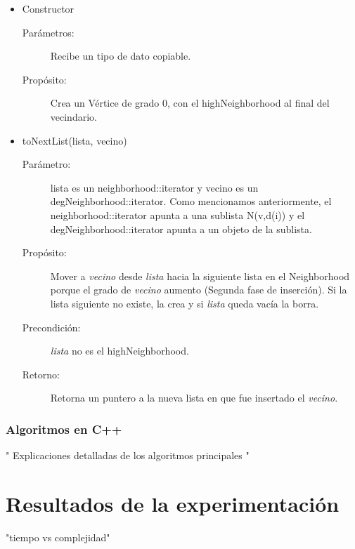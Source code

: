 \documentclass[a4paper,12pt]{article}
\begin{document}
\begin{itemize}
\item Constructor
\begin{description}
\item [Parámetros:]  Recibe un tipo de dato copiable.
\item [Propósito: ] Crea un Vértice de grado 0, con el highNeighborhood al final del vecindario.
\end{description}

\item toNextList(lista, vecino)
\begin{description}
\item[Parámetro:] lista es un neighborhood::iterator y vecino es un degNeighborhood::iterator. Como mencionamos anteriormente, el neighborhood::iterator apunta a una sublista N(v,d(i)) y el degNeighborhood::iterator apunta a un objeto de la sublista.

\item[Propósito:] Mover a \textit{vecino} desde \textit{lista} hacia la siguiente lista en el Neighborhood porque el grado de \textit{vecino} aumento (Segunda fase de inserción). Si la lista siguiente no existe, la crea y si \textit{lista} queda vacía la borra.

\item[Precondición:] \textit{lista} no es el highNeighborhood.

\item[Retorno:] Retorna un puntero a la nueva lista en que fue insertado el \textit{vecino}.
\end{description}


\end{itemize}













\subsubsection{Algoritmos en C++}
" Explicaciones detalladas de los algoritmos principales "


\section{Resultados de la experimentación}
\label{sec5}
"tiempo vs complejidad"
\end{document}
